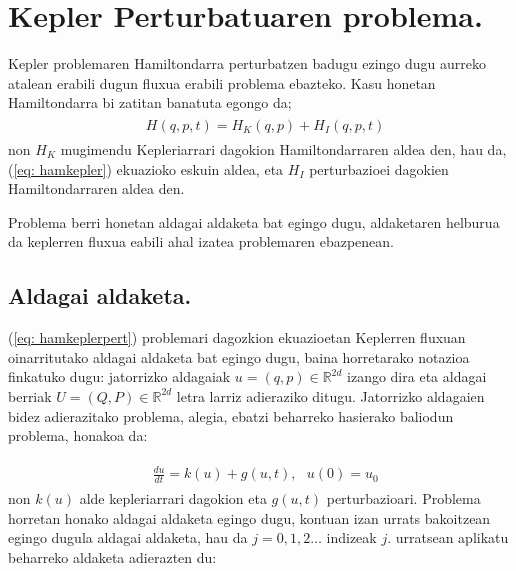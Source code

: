\section{Kepler Perturbatuaren problema.}

Kepler problemaren Hamiltondarra perturbatzen badugu ezingo dugu aurreko atalean erabili dugun fluxua erabili problema ebazteko. Kasu honetan Hamiltondarra  bi zatitan banatuta egongo da;
\begin{align}
\begin{split}
\label{eq: hamkeplerpert}
&H(q,p,t)=H_K(q,p)+H_I(q,p,t)
\end{split}
\end{align} 
non $H_K$ mugimendu Kepleriarrari dagokion Hamiltondarraren aldea den, hau da, (\ref{eq: hamkepler}) ekuazioko eskuin aldea, eta $H_I$ perturbazioei dagokien Hamiltondarraren aldea den.

Problema berri honetan aldagai aldaketa bat egingo dugu, aldaketaren helburua da keplerren fluxua eabili ahal izatea problemaren ebazpenean. 

\subsection*{Aldagai aldaketa.}



(\ref{eq: hamkeplerpert}) problemari dagozkion ekuazioetan Keplerren fluxuan oinarritutako aldagai aldaketa bat egingo dugu, baina horretarako notazioa finkatuko dugu: jatorrizko aldagaiak $u=(q,p) \in \mathbb{R}^{2d}$ izango dira eta aldagai berriak $U=(Q,P) \in \mathbb{R}^{2d}$ letra larriz adieraziko ditugu. Jatorrizko aldagaien bidez adierazitako problema, alegia, ebatzi beharreko hasierako baliodun problema, honakoa da:

\begin{align}
\begin{split}
\label{eq: HamEDA}
&\frac{du}{dt} = k(u) + g(u,t),\ \ \ u(0) = u_0
\end{split}
\end{align} 
non $k(u)$ alde kepleriarrari dagokion eta $g(u,t)$ perturbazioari. 
Problema horretan honako aldagai aldaketa egingo dugu, kontuan izan urrats bakoitzean egingo dugula aldagai aldaketa, hau da $j=0, 1, 2 \ldots$ indizeak $j$. urratsean aplikatu beharreko aldaketa adierazten du:


